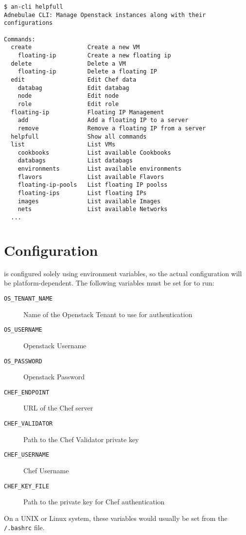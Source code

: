 \documentclass[11pt]{article}
\begin{document}
\begin{lstlisting}
$ an-cli helpfull
Adnebulae CLI: Manage Openstack instances along with their configurations

Commands:
  create                Create a new VM
    floating-ip         Create a new floating ip
  delete                Delete a VM
    floating-ip         Delete a floating IP
  edit                  Edit Chef data
    databag             Edit databag
    node                Edit node
    role                Edit role
  floating-ip           Floating IP Management
    add                 Add a floating IP to a server
    remove              Remove a floating IP from a server
  helpfull              Show all commands
  list                  List VMs
    cookbooks           List available Cookbooks
    databags            List databags
    environments        List available environments
    flavors             List available Flavors
    floating-ip-pools   List floating IP poolss
    floating-ips        List floating IPs
    images              List available Images
    nets                List available Networks
  ...
\end{lstlisting}

\section{Configuration}

\aN is configured solely using environment variables, so the actual
configuration will be platform-dependent. The following variables must
be set for \aN to run:

\begin{description}
\item[\texttt{OS\_TENANT\_NAME}] Name of the Openstack Tenant to use for authentication
\item[\texttt{OS\_USERNAME}] Openstack Username
\item[\texttt{OS\_PASSWORD}] Openstack Password
\item[\texttt{CHEF\_ENDPOINT}] URL of the Chef server
\item[\texttt{CHEF\_VALIDATOR}] Path to the Chef Validator private key
\item[\texttt{CHEF\_USERNAME}] Chef Username
\item[\texttt{CHEF\_KEY\_FILE}] Path to the private key for Chef authentication
\end{description}

On a UNIX or Linux system, these variables would usually be set from the
\texttt{\HOME/.bashrc} file.
\end{document}
